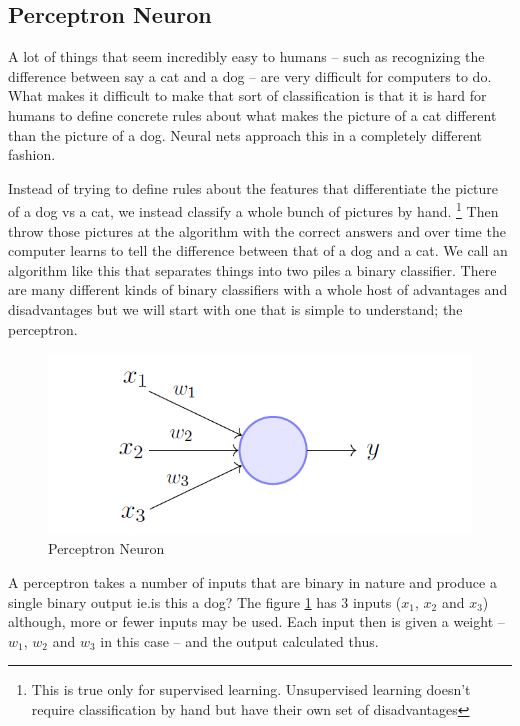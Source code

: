 \subsection{Perceptron Neuron}

A lot of things that seem incredibly easy to humans -- such as  recognizing the difference between say a cat and a dog -- are very difficult for computers to do.
What makes it difficult to make that sort of classification is that it is hard for humans to define concrete rules about what makes the picture of a cat different than the picture of a dog.
Neural nets approach this in a completely different fashion.

Instead of trying to define rules about the features that differentiate the picture of a dog vs a cat, we instead classify a whole bunch of pictures by hand.
\footnote{This is true only for supervised learning.
Unsupervised learning doesn't require classification by hand but have their own set of disadvantages}
Then throw those pictures at the algorithm with the correct answers and over time the computer learns to tell the difference between that of a dog and a cat.
We call an algorithm like this that separates things into two piles a binary classifier.
There are many different kinds of binary classifiers with a whole host of advantages and disadvantages but we will start with one that is simple to understand; the perceptron.

\begin{figure}[H]
  \centering
  \includegraphics[width=120mm]{figures/perceptron1.png}
  \caption{Perceptron Neuron}
  \label{perceptron1}
\end{figure}

A perceptron takes a number of inputs that are binary in nature and produce a single binary output ie.is this a dog? The figure \ref{perceptron1} has 3 inputs ($x_1$, $x_2$ and $x_3$) although, more or fewer inputs may be used.
Each input then is given a weight -- $w_1$, $w_2$ and $w_3$ in this case -- and the output calculated thus.

